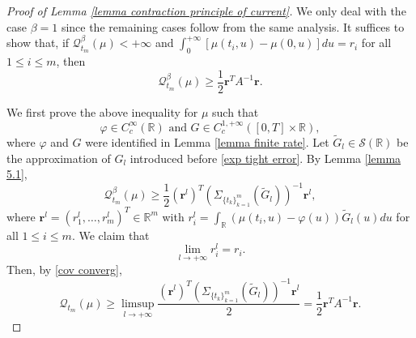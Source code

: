 \documentclass[reqno,11pt]{amsart}
\numberwithin{equation}{section}
\newcommand{\R}{\mathbb{R}}
\newcommand{\Scal}{\mathcal{S}}
\begin{document}
\begin{proof}[Proof of Lemma \ref{lemma contraction principle of current}]
	We only deal with the  case $\beta = 1$ since the remaining cases follow from the same analysis.   It suffices to show that, if  $\mathcal{Q}^\beta_{t_m}(\mu)<+\infty$ and $\int_0^{+\infty} [\mu(t_i,u)-\mu(0, u) ] du=r_i$ for all $1\leq i\leq m$, then 
	\[
	\mathcal{Q}^\beta_{t_m} (\mu)\geq \frac{1}{2} \mathbf{r}^T A^{-1} \mathbf{r}.
	\]
	
	We first prove the above inequality for $\mu$ such that
	\begin{equation}\label{equ condition 5.1}
		\varphi \in C^\infty_c(\R) \text{~and~} G \in C_c^{1,+\infty}([0, T]\times \R),
	\end{equation}
where $\varphi$ and $G$ were identified in Lemma \ref{lemma finite rate}. Let $\tilde{G}_l\in \Scal(\R)$ be the approximation of $G_l$ introduced before \eqref{exp tight error}. By Lemma \ref{lemma 5.1},
	\[
	\mathcal{Q}^\beta_{t_m} (\mu)\geq \frac{1}{2} (\mathbf{r}^l)^T\left(\Sigma_{\{t_k\}_{k=1}^m}(\tilde{G}_l)\right)^{-1}\mathbf{r}^l,
	\]
	where $\mathbf{r}^l=(r_1^l,\ldots, r_m^l)^T \in \R^m$ with $r_i^l=\int_{\R}(\mu(t_i, u)-\varphi (u))\tilde{G}_l(u)du$ for all $1\leq i\leq m$.
	We claim that
	\begin{equation}\label{equ claim proof of Lemma 5.2}
		\lim_{l\rightarrow+\infty} r_i^l= r_i.
	\end{equation}
Then, by \eqref{cov converg},
	\[
	\mathcal{Q}_{t_m} (\mu)\geq \limsup_{l\rightarrow+\infty} \frac{(\mathbf{r}^l)^T\left(\Sigma_{\{t_k\}_{k=1}^m}(\tilde{G}_l)\right)^{-1}\mathbf{r}^l}{2} = \frac{1}{2} \mathbf{r}^T A^{-1} \mathbf{r}.
	\]


\end{proof}
\end{document}
